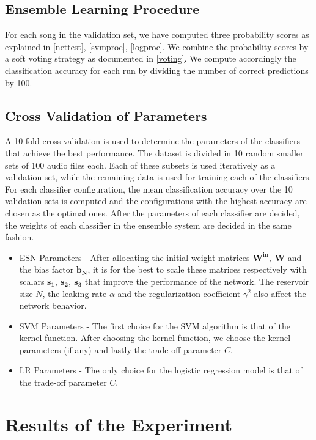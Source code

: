 \documentclass[a4paper,11pt,oneside]{article}
\begin{document}
\subsection{Ensemble Learning Procedure}
For each song in the validation set, we have computed three probability scores as explained in \ref{nettest},
\ref{svmproc}, \ref{logproc}.
We combine the probability scores by a soft voting strategy as documented in \ref{voting}. We compute accordingly
the classification accuracy for each run by dividing the number of correct predictions by 100.
\subsection{Cross Validation of Parameters}\label{cross}
A 10-fold cross validation is used to determine the parameters of the classifiers 
that achieve the best performance. The dataset is divided in 10 random smaller sets of 
100 audio files each. Each of these subsets is used iteratively as a validation set, while
the remaining data is used for training each of the classifiers. For each classifier configuration,
the mean classification accuracy over the 10 validation sets is computed and the configurations with 
the highest accuracy are chosen as the optimal ones. After the parameters of each classifier are 
decided, the weights of each classifier in the ensemble system are decided in the same fashion.
\begin{itemize}
  \item ESN Parameters - After allocating the initial weight matrices $\mathbf{W^{in}},\ \mathbf{W}$ and the bias factor $\mathbf{b_N}$, 
  it is for the best to scale these matrices respectively with scalars $\mathbf{s_1},\ \mathbf{s_2},\ \mathbf{s_3}$
  that improve the performance of the network. The reservoir size $N$, the leaking rate $\alpha$ and the regularization 
  coefficient $\gamma^2$ also affect the network behavior.
  \item SVM Parameters - The first choice for the SVM algorithm is that of the kernel function. After choosing the kernel function,
  we choose the kernel parameters (if any) and lastly the trade-off parameter $C$.
  \item LR Parameters - The only choice for the logistic regression model is that of the trade-off parameter $C$.
\end{itemize}
\section{Results of the Experiment}
\end{document}
